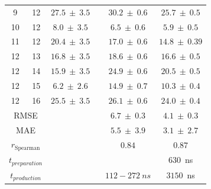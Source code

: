 \begin{table}[H]
\begin{center}
\begin{adjustbox}{max width=\textwidth}
\begin{tabular}{ | c c |c |c|c|}
        9 &  12 &   $27.5 ~\pm~ 3.5$  ~\cite{Rizzo2006}  &  $30.2 ~\pm~ 0.6$ &  $ 25.7 ~\pm~ 0.5 $\\
        10 &  12 &   $ 8.0 ~\pm~ 3.5$  ~\cite{Rizzo2006}  &  $ 6.5 ~\pm~ 0.6$ &  $  5.9 ~\pm~ 0.5 $\\
        11 &  12 &   $20.4  ~\pm~ 3.5$  ~\cite{Wolfenden1987,Rizzo2006}&  $17.0 ~\pm~ 0.6$ &  $ 14.8 ~\pm~ 0.39 $\\
        12 &  13 &   $16.8 ~\pm~ 3.5$  ~\cite{Rizzo2006} &  $18.6 ~\pm~ 0.6$ &  $ 16.6 ~\pm~ 0.5 $\\
        12 &  14 &   $15.9 ~\pm~ 3.5$  ~\cite{Rizzo2006}&  $24.9 ~\pm~ 0.6$ &  $ 20.5 ~\pm~ 0.5 $\\
        12 &  15 &    $6.2 ~\pm~ 2.6$  ~\cite{Rizzo2006, Nicholls2008}  &  $14.9 ~\pm~ 0.7$ &  $ 10.3 ~\pm~ 0.4 $\\
        12 &  16 &   $25.5 ~\pm~ 3.5$  ~\cite{Rizzo2006} &  $26.1 ~\pm~ 0.6$ &   $ 24.0 ~\pm~ 0.4 $\\
  \hline
        \multicolumn{2}{|c|}{RMSE} &          & $6.7 ~\pm~ 0.3$ & $4.1 ~\pm~ 0.3 $\\
        \multicolumn{2}{|c|}{MAE} &           & $5.5 ~\pm~ 3.9$ & $3.1 ~\pm~ 2.7$ \\
        \multicolumn{2}{|c|}{$r_{\text{Spearman}}$} &  & $0.84$ & $0.87$  \\
        \multicolumn{2}{|c|}{$t_{preparation}$} & & &  $630$~ns \\
        \multicolumn{2}{|c|}{$t_{production}$} & &$112 - 272~ns$ &  $3150$~ns \\
        \hline
\end{tabular}
\end{adjustbox}
\end{center}
\label{SITab: FE_M030_Graph}
\end{table}


